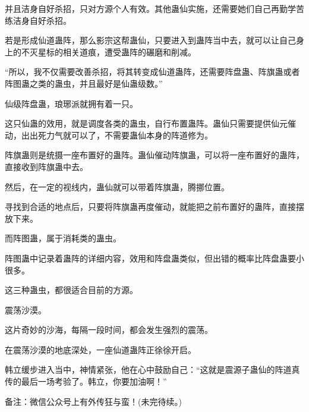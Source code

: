 \begin{this_body}
并且洁身自好杀招，只对方源个人有效。其他蛊仙实施，还需要她们自己再勤学苦练洁身自好杀招。

若是形成仙道蛊阵，那么影宗这帮蛊仙，只要进入到蛊阵当中去，就可以让自己身上的不灭星标的相关道痕，遭受蛊阵的碾磨和削减。

“所以，我不仅需要改善杀招，将其转变成仙道蛊阵，还需要阵盘蛊、阵旗蛊或者阵图蛊之类的蛊虫，并且最好是仙蛊级数。”

仙级阵盘蛊，琅琊派就拥有着一只。

这只仙蛊的效用，就是调度各类的蛊虫，自行布置蛊阵。蛊仙只需要提供仙元催动，出出死力气就可以了，不需要蛊仙本身的阵道修为。

阵旗蛊则是统摄一座布置好的蛊阵。蛊仙催动阵旗蛊，可以将一座布置好的蛊阵，直接收到阵旗蛊中去。

然后，在一定的视线内，蛊仙就可以带着阵旗蛊，腾挪位置。

寻找到合适的地点后，只要将阵旗蛊再度催动，就能把之前布置好的蛊阵，直接摆放下来。

而阵图蛊，属于消耗类的蛊虫。

阵图蛊中记录着蛊阵的详细内容，效用和阵盘蛊类似，但出错的概率比阵盘蛊要小很多。

这三种蛊虫，都很适合目前的方源。

震荡沙漠。

这片奇妙的沙海，每隔一段时间，都会发生强烈的震荡。

在震荡沙漠的地底深处，一座仙道蛊阵正徐徐开启。

韩立缓步进入当中，神情紧张，他在心中鼓励自己：“这就是震源子蛊仙的阵道真传的最后一场考验了。韩立，你要加油啊！”

备注：微信公众号上有外传狂与蛮！(未完待续。)

\end{this_body}


